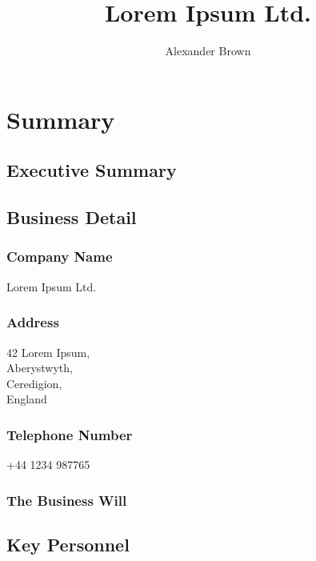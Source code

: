 \documentclass[DIV=calc, paper=a4, fontsize=11pt]{scrartcl}	 %
\title{Lorem Ipsum Ltd.} %
\author{Alexander Brown } %
\date{} %
\begin{document}
\maketitle %

\thispagestyle{fancy} %

\tableofcontents
\newpage


\section{Summary}

\subsection{Executive Summary}

\subsection{Business Detail}
\subsubsection*{Company Name}
Lorem Ipsum Ltd.

\subsubsection*{Address}
42 Lorem Ipsum,\\
Aberystwyth,\\
Ceredigion,\\
England

\subsubsection*{Telephone Number}
+44 1234 987765

\subsubsection*{The Business Will}


\subsection{Key Personnel}
\end{document}

